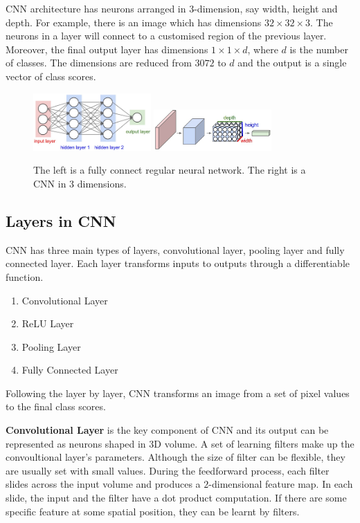 CNN architecture has neurons arranged in $3$-dimension, say width, height and depth. For example, there is an image which has dimensions $32 \times 32 \times 3$. The neurons in a layer will connect to a customised region of the previous layer. Moreover, the final output layer has dimensions $1 \times 1 \times d$, where $d$ is the number of classes. The dimensions are reduced from $3072$ to $d$ and the output is a single vector of class scores.

\graphicspath{ {./Figures/} }
\begin{figure}[!htb]
\centering
\includegraphics[width=0.4\textwidth]{neural_net2.jpeg}
\includegraphics[width=0.4\textwidth]{cnn.jpeg}
\caption{\label{fig:perceptron}The left is a fully connect regular neural network. The right is a CNN in 3 dimensions.}
\end{figure}

\subsection{Layers in CNN}
CNN has three main types of layers, convolutional layer, pooling layer and fully connected layer. Each layer transforms inputs to outputs through a differentiable function. 
\begin{enumerate}
  \item Convolutional Layer
  \item ReLU Layer
  \item Pooling Layer
  \item Fully Connected Layer
\end{enumerate}
Following the layer by layer, CNN transforms an image from a set of pixel values to the final class scores.

\textbf{Convolutional Layer} is the key component of CNN and its output can be represented as neurons shaped in 3D volume. A set of learning filters make up the convoultional layer's parameters. Although the size of filter can be flexible, they are usually set with small values. During the feedforward process, each filter slides across the input volume and produces a $2$-dimensional feature map. In each slide, the input and the filter have a dot product computation. If there are some specific feature at some spatial position, they can be learnt by filters.

